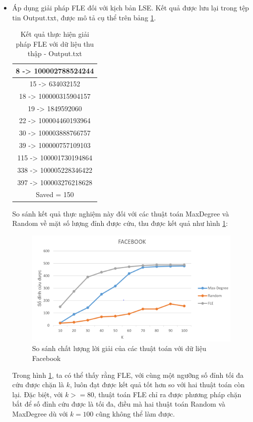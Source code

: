 \begin{itemize}
	\item Áp dụng giải pháp FLE đối với kịch bản LSE. Kết quả được lưu lại trong tệp tin Output.txt, được mô tả cụ thể trên bảng \ref{bang4_6}.
	\begin{table} [!htp]
		\centering
		\begin{tabular}{|c|}
			\hline
			8 -> 100002788524244\\
			\hline
			15 -> 634032152\\
			\hline
			18 -> 100000315904157\\
			\hline
			19 -> 1849592060\\
			\hline
			22 -> 100004460193964\\
			\hline
			30 -> 100003888766757\\
			\hline
			39 -> 100000757109103\\
			\hline
			115 -> 100001730194864\\
			\hline
			338 -> 100005228346422\\
			\hline
			397 -> 100003276218628\\
			\hline
			Saved = 150\\
			\hline 
		\end{tabular}
		\caption{Kết quả thực hiện giải pháp FLE với dữ liệu thu thập - Output.txt}
		\label{bang4_6} 
	\end{table}
	
	So sánh kết quả thực nghiệm này đối với các thuật toán MaxDegree và Random về mặt số lượng đỉnh được cứu, thu được kết quả như hình \ref{fig:FLE_FB}:
	
	\begin{center}
		\begin{figure}[htp]
			\begin{center}
				\includegraphics [scale = 1.2]{picture/FLE/FB_res}
			\end{center}
			\caption{So sánh chất lượng lời giải của các thuật toán với dữ liệu Facebook}
			\label{fig:FLE_FB}
		\end{figure}
	\end{center}	
	Trong hình \ref{fig:FLE_FB}, ta có thể thấy rằng FLE, với cùng một ngưỡng số đỉnh tối đa cứu được chặn là $k$, luôn đạt được kết quả tốt hơn so với hai thuật toán còn lại. Đặc biệt, với $k>=80$, thuật toán FLE chỉ ra được phương pháp chặn bắt để số đỉnh cứu được là tối đa, điều mà hai thuật toán Random và MaxDegree dù với $k=100$ cũng không thể làm được.
	

\end{itemize}
